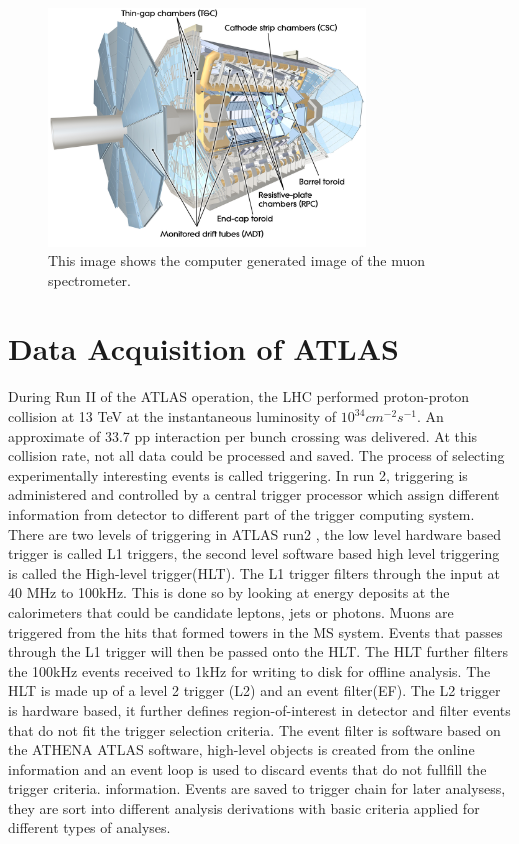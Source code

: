 
\begin{figure}[!htb]
    \begin{center}
        \includegraphics[width=0.75\textwidth]{figures/chapter_ATLAS/MuonSpectrometer}
        \caption{
		    This image shows the computer generated image of the muon spectrometer. \cite{Pequenao:1095929}
        }
        \label{fig:MuonSpectrometer}
    \end{center}
\end{figure}

\section{Data Acquisition of ATLAS}
During Run II of the ATLAS operation, the LHC performed proton-proton collision at 13 TeV at the instantaneous luminosity of $10^{34}cm^{-2}s^{-1}$. An approximate of 33.7 pp interaction per bunch crossing was delivered. 
At this collision rate, not all data could be processed and saved. The process of selecting experimentally interesting events is called triggering. In run 2, triggering is administered and controlled by a central trigger processor which assign different information from detector to different part of the trigger computing system. There are two levels of triggering in ATLAS run2 , the low level hardware based trigger is called L1 triggers, the second level software based high level triggering is called the High-level trigger(HLT). 
The L1 trigger filters through the input at 40 MHz to 100kHz. This is done so by looking at energy deposits at the calorimeters that could be
candidate leptons, jets or photons. Muons are triggered from the hits that formed towers in the MS system. 
Events that passes through the L1 trigger will then be passed onto the HLT. The HLT further filters the 100kHz events received to 1kHz for writing to disk for offline analysis. The HLT is made  up of a level 2 trigger (L2) and an event filter(EF). The L2 trigger is hardware based, it further defines region-of-interest in detector and filter events that do not fit the trigger selection criteria. The event filter is software based on the ATHENA ATLAS software, high-level objects is created from
the online information and an event loop is used to discard events that do not fullfill the trigger criteria.
information. 
Events are saved to trigger chain for later analysess, they are sort into different analysis derivations with basic criteria applied for different types of analyses. 

